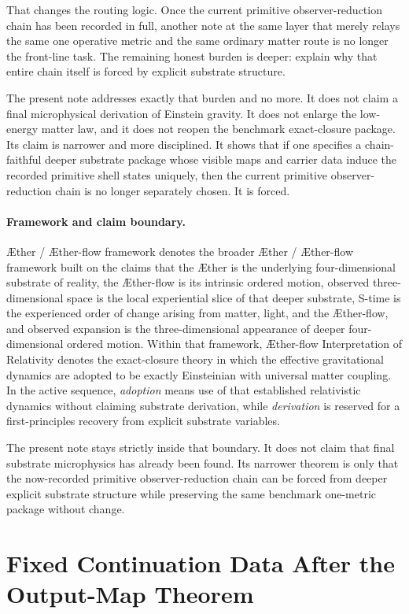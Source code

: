 \documentclass[11pt]{article}
\newcommand{\Aether}{\AE{}ther}
\newcommand{\Aflow}{\AE{}ther-flow}
\newcommand{\TheoryName}{\Aflow{} Interpretation of Relativity}
\newcommand{\TheoryProgram}{\Aether{} / \Aflow{} framework}
\begin{document}
That changes the routing logic. Once the current primitive observer-reduction chain has been recorded in full, another note at the same layer that merely relays the same one operative metric and the same ordinary matter route is no longer the front-line task. The remaining honest burden is deeper: explain why that entire chain itself is forced by explicit substrate structure.

The present note addresses exactly that burden and no more. It does not claim a final microphysical derivation of Einstein gravity. It does not enlarge the low-energy matter law, and it does not reopen the benchmark exact-closure package. Its claim is narrower and more disciplined. It shows that if one specifies a chain-faithful deeper substrate package whose visible maps and carrier data induce the recorded primitive shell states uniquely, then the current primitive observer-reduction chain is no longer separately chosen. It is forced.

\paragraph{Framework and claim boundary.}
\TheoryProgram{} denotes the broader \Aether{} / \Aflow{} framework built on the claims that the \Aether{} is the underlying four-dimensional substrate of reality, the \Aflow{} is its intrinsic ordered motion, observed three-dimensional space is the local experiential slice of that deeper substrate, S-time is the experienced order of change arising from matter, light, and the \Aflow{}, and observed expansion is the three-dimensional appearance of deeper four-dimensional ordered motion. Within that framework, \TheoryName{} denotes the exact-closure theory in which the effective gravitational dynamics are adopted to be exactly Einsteinian with universal matter coupling. In the active sequence, \emph{adoption} means use of that established relativistic dynamics without claiming substrate derivation, while \emph{derivation} is reserved for a first-principles recovery from explicit substrate variables.

The present note stays strictly inside that boundary. It does not claim that final substrate microphysics has already been found. Its narrower theorem is only that the now-recorded primitive observer-reduction chain can be forced from deeper explicit substrate structure while preserving the same benchmark one-metric package without change.

\section{Fixed Continuation Data After the Output-Map Theorem}
\end{document}
